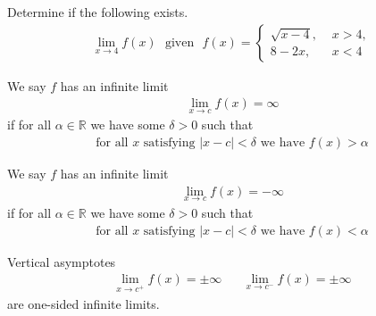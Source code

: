 \begin{exercise}
Determine if the following exists.
\begin{align*}
    \lim_{x \longrightarrow 4} f(x) \hspace{8pt} \text{given} \hspace{8pt} f(x) = 
    \begin{cases}
    \sqrt{x-4}, \hspace{4pt} &x > 4,\\[2ex]
    8-2x, \hspace{4pt} &x < 4
    \end{cases}
\end{align*}
\end{exercise}

\begin{definition}
We say $f$ has an infinite limit 
\begin{align*}
    \lim_{x \longrightarrow c} f(x) = \infty
\end{align*}
if for all $\alpha \in \mathbb{R}$ we have some $\delta > 0$ such that
\begin{align*}
    \text{for all} \hspace{4pt} x \hspace{4pt} \text{satisfying} \hspace{4pt} \lvert x - c \rvert < \delta \hspace{4pt} \text{we have} \hspace{4pt} f(x) > \alpha
\end{align*}
\end{definition}

\begin{definition}
We say $f$ has an infinite limit 
\begin{align*}
    \lim_{x \longrightarrow c} f(x) = -\infty
\end{align*}
if for all $\alpha \in \mathbb{R}$ we have some $\delta > 0$ such that
\begin{align*}
    \text{for all} \hspace{4pt} x \hspace{4pt} \text{satisfying} \hspace{4pt} \lvert x - c \rvert < \delta \hspace{4pt} \text{we have} \hspace{4pt} f(x) < \alpha
\end{align*}
\end{definition}

\begin{recall}
Vertical asymptotes
\begin{align*}
    \lim_{x \longrightarrow c^{+}} f(x) = \pm\infty \hspace{20pt} \lim_{x \longrightarrow c^{-}} f(x) = \pm\infty 
\end{align*}
are one-sided infinite limits.
\end{recall}

